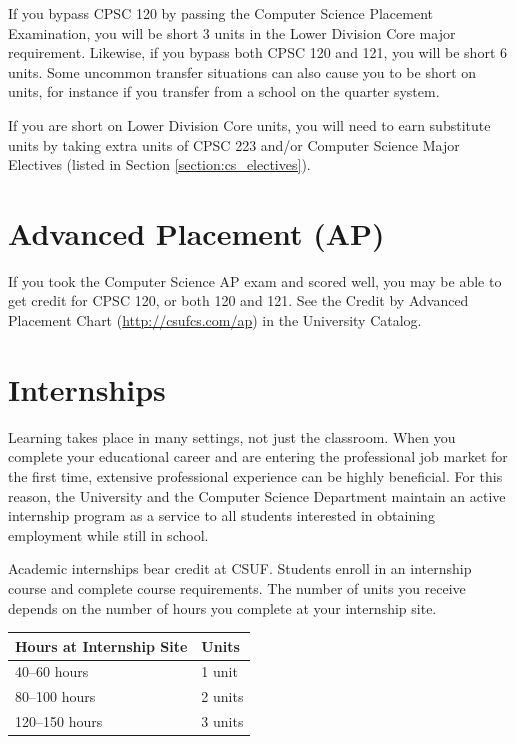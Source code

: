 \documentclass{book}
\newcommand{\CampusName}{CSUF}
\newcommand{\shrunkurl}[1]{\url{http://csufcs.com/#1}}
\begin{document}
If you bypass CPSC 120 by passing the Computer Science Placement
Examination, you will be short 3 units in the Lower Division Core
major requirement. Likewise, if you bypass both CPSC 120 and 121, you
will be short 6 units. Some uncommon transfer situations can also
cause you to be short on units, for instance if you transfer from a
school on the quarter system.

If you are short on Lower Division Core units, you will need to earn
substitute units by taking extra units of CPSC 223 and/or Computer
Science Major Electives (listed in Section
\ref{section:cs_electives}).


\section{Advanced Placement (AP)}
\label{section:ap}
 If you took the Computer Science AP
exam and scored well, you may be able to get credit for CPSC 120, or
both 120 and 121. See the Credit by Advanced Placement Chart
(\shrunkurl{ap}) in the University Catalog.

\section{Internships}

Learning takes place in many settings, not just the classroom. When
you complete your educational career and are entering the professional
job market for the first time, extensive professional experience can
be highly beneficial. For this reason, the University and the Computer
Science Department maintain an active internship program as a service
to all students interested in obtaining employment while still in
school.

Academic internships bear credit at \CampusName. Students enroll in an
internship course and complete course requirements. The number of
units you receive depends on the number of hours you complete at your
internship site.

\begin{center}
\begin{tabular}{|l|l|} \hline
  \textbf{Hours at Internship Site} & \textbf{Units} \\ \hline
  40--60 hours & 1 unit \\ \hline
  80--100 hours & 2 units \\ \hline
  120--150 hours & 3 units \\ \hline
\end{tabular}
\end{center}
\end{document}

